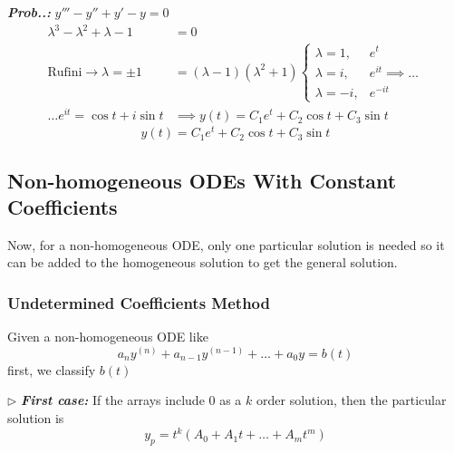 \documentclass[a4paper]{article}
\begin{document}
\vspace{2ex}\textbf{\textit{Prob.\thesection.\theprob: }}$y'''-y''+y'-y=0$ 
\begin{align}
\lambda^{3}-\lambda^{2}+\lambda-1&=0 \\
\text{Rufini}\to \lambda=\pm1&=(\lambda-1)(\lambda^{2}+1)
\begin{cases}
\lambda=1,&e^{ t }  \\
\lambda=i,&e^{ it } \implies \dots \\
\lambda=-i,&e^{ -it }
\end{cases} \\
\dots e^{ it }=\cos t + i\sin t&\implies y(t)=C_{1}e^{ t }+C_{2}\cos t+C_{3}\sin t
\end{align}
$$
\boxed{y(t)=C_{1}e^{ t }+C_{2}\cos t+C_{3}\sin t}
$$
\subsection{Non-homogeneous ODEs With Constant Coefficients}
\setcounter{equation}{0}

Now, for a non-homogeneous ODE, only one particular solution is needed so it can be added to the homogeneous solution to get the general solution.

\subsubsection{Undetermined Coefficients Method}
\setcounter{equation}{0}
Given a non-homogeneous ODE like
$$
a_{n}y^{(n)}+a_{n-1}y^{(n-1)}+\dots+a_{0}y=b(t)
$$
first, we classify $b(t)$

$\triangleright$ \textbf{\textit{First case:}} If the arrays include $0$ as a $k$ order solution, then the particular solution is
$$
y_{p}=t^{k}(A_{0}+A_{1}t+\dots+A_{m}t^{m})
$$
\end{document}
